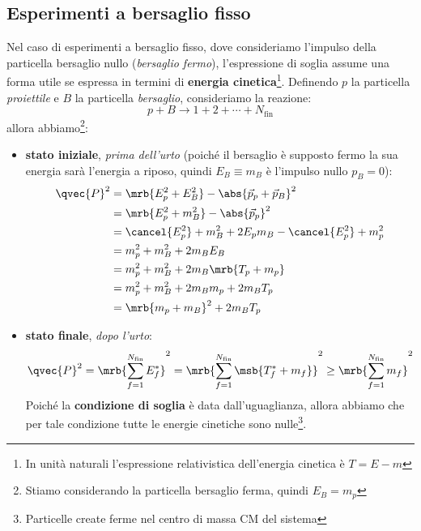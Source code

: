 \subsection{Esperimenti a bersaglio fisso}
Nel caso di esperimenti a bersaglio fisso, dove consideriamo l'impulso della
particella bersaglio nullo (\textit{bersaglio fermo}), l'espressione di soglia
assume una forma utile se espressa in termini di \textbf{energia
	cinetica}\footnote{
	In unità naturali l'espressione relativistica dell'energia
	cinetica è $T = E - m$
}.
Definendo $p$ la particella \textit{proiettile} e $B$ la particella
\textit{bersaglio}, consideriamo la reazione:
\begin{equation}
	p + B \longrightarrow 1 + 2 + \cdots + N_\text{fin}
\end{equation}
allora abbiamo\footnote{
	Stiamo considerando la particella bersaglio ferma, quindi
	$E_B = m_p$
}:
\begin{itemize}
	\item \textbf{stato iniziale}, \textit{prima dell'urto} (poiché il bersaglio
	      è supposto fermo la sua energia sarà l'energia a riposo, quindi
	      $E_B \equiv m_B$ è l'impulso nullo
	      $p_B = 0$):
	      \begin{align}
		      \label{eq:soglia_cinetica_iniziale}
		      \qvec{P}^2
		       & = \mrb{E_p^2 + E_B^2} - \abs{\vec{p}_p + \vec{p}_{B}}^2
		      \\\notag
		       & = \mrb{E_p^2 + m_B^2} - \abs{\vec{p}_p}^2
		      \\\notag
		       & = \cancel{E_p^2} + m_B^2 + 2 E_p m_B - \cancel{E_p^2} + m_p^2
		      \\\notag
		       & = m_p^2 + m_B^2 + 2 m_B E_B
		      \\\notag
		       & = m_p^2 + m_B^2 + 2 m_B \mrb{T_p + m_p}
		      \\\notag
		       & = m_p^2 + m_B^2 + 2 m_B m_p + 2 m_B T_p
		      \\\notag
		       & = \mrb{m_p + m_B}^2 + 2 m_B T_p
	      \end{align}
	\item \textbf{stato finale}, \textit{dopo l'urto}:
	      \begin{equation}
		      \qvec{P}^2
		      = \mrb{\sum_{f=1}^{N_\text{fin}} E_f^*}^2
		      = \mrb{\sum_{f=1}^{N_\text{fin}} \msb{T_f^* + m_f}}^2
		      \geq \mrb{\sum_{f=1}^{N_\text{fin}} m_f}^2
		      \label{eq:soglia_cinetica_finale}
	      \end{equation}
	      Poiché la \textbf{condizione di soglia} è data dall'uguaglianza, allora
	      abbiamo che per tale condizione tutte le energie cinetiche sono
	      nulle\footnote{
		      Particelle create ferme nel centro di massa CM del sistema
	      }.
\end{itemize}

